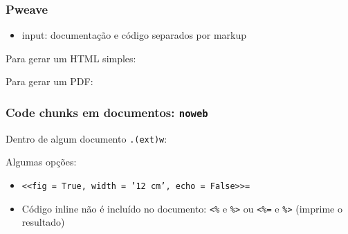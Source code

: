 \documentclass{beamer}
\begin{document}
\begin{frame}[fragile]
  \frametitle{Pweave}
  \begin{itemize}
  \item input: documentação e código separados por markup \href{exemplos/ctd.py}{}
  \end{itemize}      

  \vfill
  
  Para gerar um HTML simples:
  \begin{center}
  \end{center}
  Para gerar um PDF:
  \begin{center}
  \end{center}
\end{frame}

\begin{frame}[fragile]
  \frametitle{Code chunks em documentos: \texttt{noweb}}
  Dentro de algum documento \texttt{.(ext)\alert{w}}:
  \begin{center}
  \end{center}
  \vfill
  Algumas opções:
  \begin{itemize}
  \item \texttt{<<fig = True, width = '12 cm', echo = False>>=}
  \item Código inline não é incluído no documento: \texttt{<\%} e \texttt{\%>} ou \texttt{<\%=} e \texttt{\%>} (imprime o resultado)
  \end{itemize}
\end{frame}  
\end{document}
